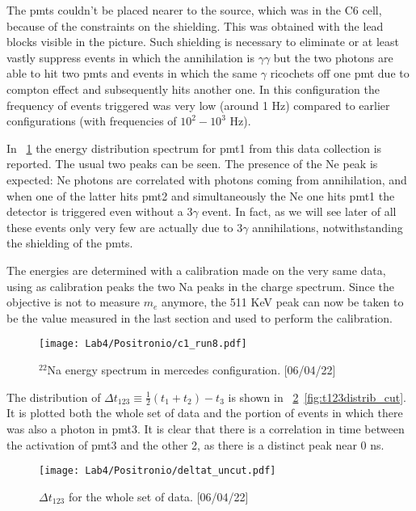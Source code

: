 \documentclass[10pt,a4paper,twocolumn]{article}
\begin{document}
The pmts couldn't be placed nearer to the source, which was in the C6 cell, because of the constraints on the shielding. This was obtained with the lead blocks visible in the picture. Such shielding is necessary to eliminate or at least vastly suppress events in which the annihilation is $\gamma \gamma$ but the two photons are able to hit two pmts and events in which the same $\gamma$ ricochets off one pmt due to compton effect and subsequently hits another one. In this configuration the frequency of events triggered was very low (around 1 Hz) compared to earlier configurations (with frequencies of $10^2-10^3$ Hz).

In \figurename~\ref{fig:c1mercedes} the energy distribution spectrum for pmt1 from this data collection is reported. The usual two peaks can be seen. The presence of the Ne peak is expected: Ne photons are correlated with photons coming from annihilation, and when one of the latter hits pmt2 and simultaneously the Ne one hits pmt1 the detector is triggered even without a $3\gamma$ event. In fact, as we will see later of all these events only very few are actually due to 3$\gamma$ annihilations, notwithstanding the shielding of the pmts.

The energies are determined with a calibration made on the very same data, using as calibration peaks the two Na peaks in the charge spectrum. Since the objective is not to measure $m_e$ anymore, the 511 KeV peak can now be taken to be the value measured in the last section and used to perform the calibration.

\begin{figure}[h!]
\centering
\texttt{[image: Lab4/Positronio/c1\_run8.pdf]} 
\caption{$^{22}$Na energy spectrum in mercedes configuration. [06/04/22]}
\label{fig:c1mercedes}
\end{figure}

The distribution of $\Delta t_{123} \equiv \frac{1}{2}(t_1+t_2)-t_3$ is shown in \figurename~\ref{fig:t123distrib_uncut}~\ref{fig:t123distrib_cut}. It is plotted both the whole set of data and the portion of events in which there was also a photon in pmt3. It is clear that there is a correlation in time between the activation of pmt3 and the other 2, as there is a distinct peak near 0 ns. 

\begin{figure}[h!]
\centering
\texttt{[image: Lab4/Positronio/deltat\_uncut.pdf]} 
\caption{$\Delta t_{123}$ for the whole set of data. [06/04/22]}
\label{fig:t123distrib_uncut}
\end{figure}
\end{document}
